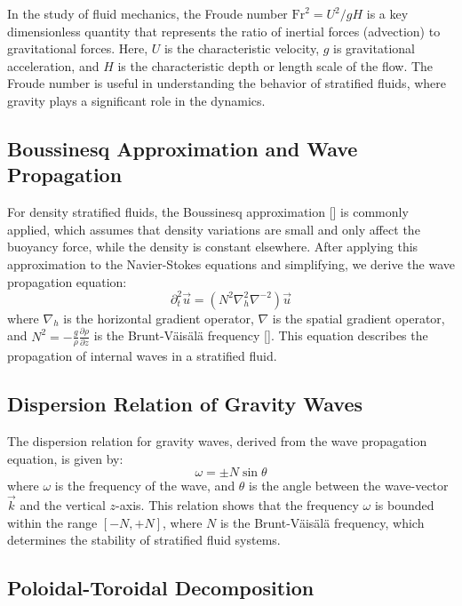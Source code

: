 \documentclass[final,5p,times,twocolumn,authoryear]{elsarticle}
\newcommand{\pd}[2]{\frac{\partial #1}{\partial #2}}
\begin{document}
In the study of fluid mechanics, the Froude number $\mathrm{Fr}^2 = U^2 / gH$ is a key dimensionless quantity that represents the ratio of inertial forces (advection) to gravitational forces. Here, $U$ is the characteristic velocity, $g$ is gravitational acceleration, and $H$ is the characteristic depth or length scale of the flow. The Froude number is useful in understanding the behavior of stratified fluids, where gravity plays a significant role in the dynamics.

\subsection{Boussinesq Approximation and Wave Propagation}

For density stratified fluids, the Boussinesq approximation [\cite{boussinesq_theorie_1897}] is commonly applied, which assumes that density variations are small and only affect the buoyancy force, while the density is constant elsewhere. After applying this approximation to the Navier-Stokes equations and simplifying, we derive the wave propagation equation:
\begin{equation}
\partial^2_t \vec{u} = \left( N^2 \nabla^2_h \nabla^{-2} \right) \vec{u} \label{eq:Wave Propagation}
\end{equation}
where $\nabla_h$ is the horizontal gradient operator, $\nabla$ is the spatial gradient operator, and $N^2 = -\frac{g}{\rho} \pd{\rho}{z}$ is the Brunt-Väisälä frequency [\cite{pedlosky_geophysical_1979}]. This equation describes the propagation of internal waves in a stratified fluid.

\subsection{Dispersion Relation of Gravity Waves}

The dispersion relation for gravity waves, derived from the wave propagation equation, is given by:
\begin{equation}
\omega = \pm N \sin{\theta} \label{eq:Dispersion relation}
\end{equation}
where $\omega$ is the frequency of the wave, and $\theta$ is the angle between the wave-vector $\vec{k}$ and the vertical $z$-axis. This relation shows that the frequency $\omega$ is bounded within the range $\left[ -N, +N \right]$, where $N$ is the Brunt-Väisälä frequency, which determines the stability of stratified fluid systems.

\subsection{Poloidal-Toroidal Decomposition}
\end{document}

